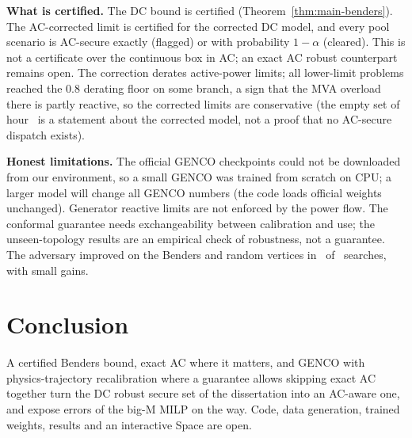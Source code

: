\documentclass[conference]{IEEEtran}
\theoremstyle{remark}
\begin{document}
\textbf{What is certified.} The DC bound is certified (Theorem~\ref{thm:main-benders}). The
AC-corrected limit is certified for the corrected DC model, and every pool scenario is
AC-secure exactly (flagged) or with probability $1-\alpha$ (cleared). This is not a
certificate over the continuous box in AC; an exact AC robust counterpart remains open.
The correction derates active-power limits; all lower-limit problems reached the 0.8
derating floor on some branch, a sign that the MVA overload there is partly reactive, so
the corrected limits are conservative (the empty set of hour \NEeEmptyHourList\ is a
statement about the corrected model, not a proof that no AC-secure dispatch exists).

\textbf{Honest limitations.} The official GENCO checkpoints could not be downloaded from
our environment, so a small GENCO was trained from scratch on CPU; a larger model will
change all GENCO numbers (the code loads official weights unchanged). Generator
reactive limits are not enforced by the power flow. The conformal guarantee needs
exchangeability between calibration and use; the unseen-topology results are an
empirical check of robustness, not a guarantee. The adversary improved on the Benders and random
vertices in \NAdvWins\ of \NAdvCases\ searches, with small gains.

\section{Conclusion}
A certified Benders bound, exact AC where it matters, and GENCO with
physics-trajectory recalibration where a guarantee allows skipping exact AC together
turn the DC robust secure set of the dissertation into an AC-aware one, and expose
errors of the big-M MILP on the way. Code, data generation, trained weights, results
and an interactive Space are open.

\clearpage\onecolumn\setlength{\vsize}{\textheight}%
\raggedbottom
\allowdisplaybreaks
\appendices

\end{document}
